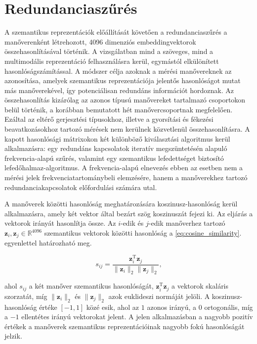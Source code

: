 \documentclass[12pt,a4paper,onehalfspacing, oneside]{book} %
\begin{document}
\section{Redundanciaszűrés}
A szemantikus reprezentációk előállítását követően a redundanciaszűrés a manőverenként létrehozott, 4096 dimenziós embeddingvektorok összehasonlításával történik. A vizsgálatban mind a szöveges, mind a multimodális reprezentáció felhasználásra kerül, egymástól elkülönített hasonlóságszámítással. A módszer célja azoknak a mérési manővereknek az azonosítása, amelyek szemantikus reprezentációja jelentős hasonlóságot mutat más manőverekével, így potenciálisan redundáns információt hordoznak. Az összehasonlítás kizárólag az azonos típusú manővereket tartalmazó csoportokon belül történik, a korábban bemutatott hét manővercsoportnak megfelelően. Ezáltal az eltérő gerjesztési típusokhoz, illetve a gyorsítási és fékezési beavatkozásokhoz tartozó mérések nem kerülnek közvetlenül összehasonlításra. A kapott hasonlósági mátrixokon két különböző kiválasztási algoritmus kerül alkalmazásra: egy redundáns kapcsolatok iteratív megszüntetésén alapuló frekvencia-alapú szűrés, valamint egy szemantikus lefedettséget biztosító lefedőhalmaz-algoritmus. A frekvencia-alapú elnevezés ebben az esetben nem a mérési jelek frekvenciatartománybeli elemzésére, hanem a manőverekhez tartozó redundanciakapcsolatok előfordulási számára utal.

A manőverek közötti hasonlóság meghatározására koszinusz-hasonlóság kerül alkalmazásra, amely két vektor által bezárt szög koszinuszát fejezi ki. Az eljárás a vektorok irányát hasonlítja össze. Az $i$-edik és $j$-edik manőverhez tartozó $\mathbf{z}_i,\mathbf{z}_j \in \mathbb{R}^{4096}$ szemantikus vektorok közötti hasonlóság a \ref{eq:cosine_similarity}. egyenlettel határozható meg.

\begin{equation}
s_{ij}=\frac{\mathbf{z}_i^\mathrm{T}\mathbf{z}_j}{\|\mathbf{z}_i\|_2\|\mathbf{z}_j\|_2},
\label{eq:cosine_similarity}
\end{equation}

ahol $s_{ij}$ a két manőver szemantikus hasonlóságát, $\mathbf{z}_i^\mathrm{T}\mathbf{z}_j$ a vektorok skaláris szorzatát, míg $\|\mathbf{z}_i\|_2$ és $\|\mathbf{z}_j\|_2$ azok euklideszi normáját jelöli. A koszinusz-hasonlóság értéke $[-1,1]$ közé esik, ahol az $1$ azonos irányú, a $0$ ortogonális, míg a $-1$ ellentétes irányú vektorokat jelent. A jelen alkalmazásban a nagyobb pozitív értékek a manőverek szemantikus reprezentációinak nagyobb fokú hasonlóságát jelzik.
\end{document}
